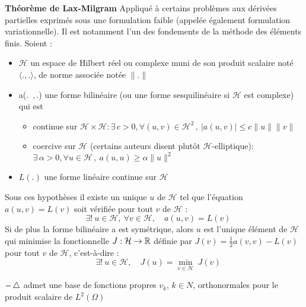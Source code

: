 \documentclass{book}
\begin{document}
\textbf{Th\'eor\`eme de Lax-Milgram}\newline
Appliqu\'e \`a certains probl\`emes aux d\'eriv\'ees partielles exprim\'es sous une formulation faible (appel\'ee \'egalement formulation variationnelle).
Il est notamment l'un des fondements de la m\'ethode des \'el\'ements finis.
Soient :
\begin{itemize}
\item $\mathcal{H}$ un espace de Hilbert r\'eel ou complexe muni de son produit scalaire not\'e $\langle.,.\rangle$, de norme associ\'ee not\'ee $\|.\|$
\item a(.\, ,\,.) une forme bilin\'eaire (ou une forme sesquilin\'eaire si $\mathcal{H}$ est complexe) qui est
	\begin{itemize}
	\item continue sur $\mathcal{H}\times\mathcal{H} : \exists\,c>0, \forall (u,v)\in \mathcal{H}^2\,,\ |a(u,v)|\leq c\|u\|\|v\|$
	\item coercive sur $\mathcal{H}$ (certains auteurs disent plut\^ot $\mathcal{H}$-elliptique):
		$\exists\,\alpha>0, \forall u\in\mathcal{H}\,,\ a(u,u) \geq \alpha\|u\|^2$
	\end{itemize}
\item $L(.)$ une forme lin\'eaire continue sur $\mathcal{H}$
\end{itemize}
Sous ces hypoth\`eses il existe un unique $u$ de $\mathcal{H}$ tel que l'\'equation $a(u,v)=L(v)$ soit v\'erifi\'ee pour tout $v$ de $\mathcal{H}$ :
$$
\quad \exists!\ u \in \mathcal{H},\ \forall v\in\mathcal{H},\quad a(u,v)=L(v)
$$
Si de plus la forme bilin\'eaire a est sym\'etrique, alors $u$ est l'unique \'el\'ement de $\mathcal{H}$ qui
minimise la fonctionnelle $J:\mathcal{H}\rightarrow\mathbb{R}$ d\'efinie par $J(v) = \tfrac{1}{2}a(v,v)-L(v)$ pour tout $v$ de $\mathcal{H}$, c'est-\`a-dire :
$$
\quad \exists!\ u \in \mathcal{H},\quad J(u) = \min_{v\in\mathcal{H}}\ J(v)
$$
\bigskip

$-\mathop{}\!\mathbin\bigtriangleup $ admet une base de fonctions propres $v_k$, $k \in N$,
orthonormales pour le produit scalaire de $L^2(\Omega)$

\end{document}
